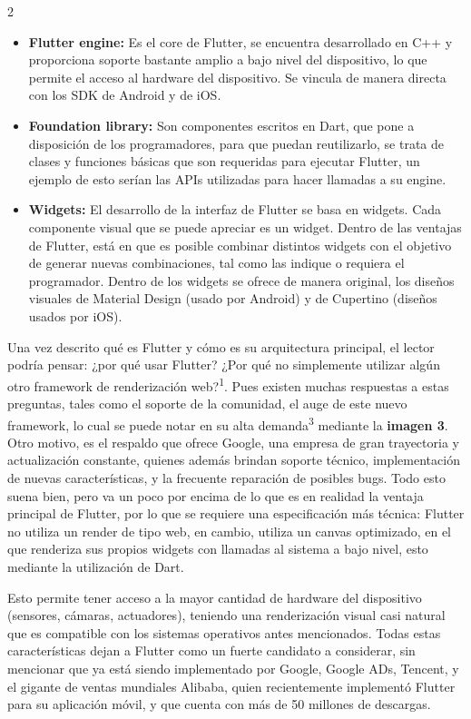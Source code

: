 \documentclass[12pt,spanish,Letterpaper,openany]{book}
\begin{document}
\begin {multicols}{2}
\begin{itemize}
\item
  \textbf{Flutter engine:} Es el core de Flutter, se encuentra desarrollado en C++ y proporciona soporte bastante amplio a bajo nivel del dispositivo, lo que permite el acceso al hardware del dispositivo. Se vincula de manera directa con los SDK de Android y de iOS.
\item
  \textbf{Foundation library:} Son componentes escritos en Dart, que pone a disposición de los programadores, para que puedan reutilizarlo, se trata de clases y funciones básicas que son requeridas para ejecutar Flutter, un ejemplo de esto serían las APIs utilizadas para hacer llamadas a su engine.
\item
  \textbf{Widgets:} El desarrollo de la interfaz de Flutter se basa en widgets. Cada componente visual que se puede apreciar es un widget. Dentro de las ventajas de Flutter, está en que es posible combinar distintos widgets con el objetivo de generar nuevas combinaciones, tal como las indique o requiera el programador. Dentro de los widgets se ofrece de manera original, los diseños visuales de Material Design (usado por Android) y de Cupertino (diseños usados por iOS).
\end{itemize}

Una vez descrito qué es Flutter y cómo es su arquitectura principal, el lector podría pensar: ¿por qué usar Flutter? ¿Por qué no simplemente utilizar algún otro framework de renderización web?\textsuperscript{1}. Pues existen muchas respuestas a estas preguntas, tales como el soporte de la comunidad, el auge de este nuevo framework, lo cual se puede notar en su alta demanda\textsuperscript{3} mediante la \textbf{imagen 3}. Otro motivo, es el respaldo que ofrece Google, una empresa de gran trayectoria y actualización constante, quienes además brindan soporte técnico, implementación de nuevas características, y la frecuente reparación de posibles bugs. Todo esto suena bien, pero va un poco por encima de lo que es en realidad la ventaja principal de Flutter, por lo que se requiere una especificación más técnica: Flutter no utiliza un render de tipo web, en cambio, utiliza un canvas optimizado, en el que renderiza sus propios widgets con llamadas al sistema a bajo nivel, esto mediante la utilización de Dart.

Esto permite tener acceso a la mayor cantidad de hardware del dispositivo (sensores, cámaras, actuadores), teniendo una renderización visual casi natural que es compatible con los sistemas operativos antes mencionados. Todas estas características dejan a Flutter como un fuerte candidato a considerar, sin mencionar que ya está siendo implementado por Google, Google ADs, Tencent, y el gigante de ventas mundiales Alibaba, quien recientemente implementó Flutter para su aplicación móvil, y que cuenta con más de 50 millones de descargas.


\end{multicols}
\end{document}

